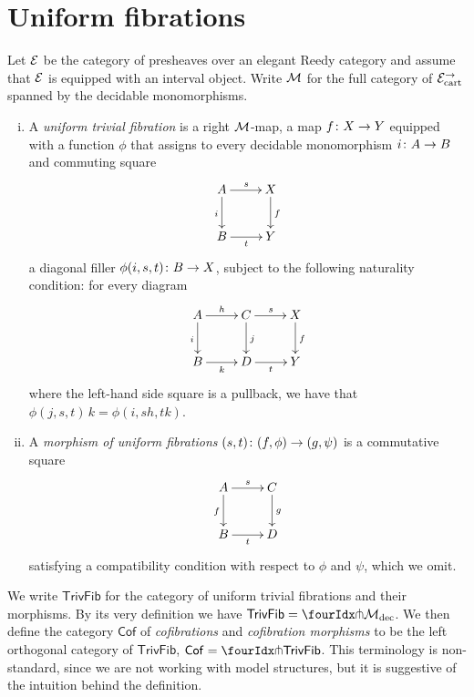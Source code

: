 \documentclass[reqno,10pt,a4paper,oneside]{amsart}
\begin{document}
\section{Uniform  fibrations}
\label{sec:uniform-kan-fibrations}

 
Let $\cal{E}$ be the category of presheaves over an elegant Reedy category and assume that $\cal{E}$
is equipped with an interval object. Write $\cal{M}$ for the full category of $\cal{E}^\to_\cart$ spanned
by the decidable monomorphisms. 

\begin{definition} \hfill
\begin{enumerate}[(i)]
\item A \emph{uniform trivial  fibration} is a right $\cal{M}$-map, \ie a map
$f  \co X \to Y$ equipped with a function $\phi$
that assigns to every decidable monomorphism $i \co A \to B$ and commuting square 
 \[
 \xymatrix{
 A \ar[r]^s \ar[d]_i & X \ar[d]^f \\
 B \ar[r]_t & Y}
 \]
a diagonal filler $\phi(i, s, t) \co B \to X$, subject to the following naturality condition: for every 
diagram 
\[
\xymatrix{
A \ar[r]^{h} \ar[d]_{i} & C \ar[d]^{j}  \ar[r]^s & X \ar[d]^f \\
B \ar[r]_{k} & D \ar[r]_t & Y }
\]
where the left-hand side square is a pullback, we have that $\phi(j, s, t) \, k = \phi(i, s  h, t  k)$.
 \item A \emph{morphism of uniform  fibrations} $(s, t) \co (f, \phi) \to (g, \psi)$ is a commutative
 square
 \[
 \xymatrix{
  A \ar[d]_f \ar[r]^s & C \ar[d]^g \\
  B \ar[r]_{t}& D} 
  \]
  satisfying a compatibility condition with respect to $\phi$ and $\psi$, which we omit. 
\end{enumerate}
\end{definition}

We write $\mathsf{TrivFib}$ for the category of uniform trivial fibrations and their morphisms.
By its very definition we have $\mathsf{TrivFib} = \liftr{\cal{M}_{\textup{dec}}}$. We then define
the category $\mathsf{Cof}$ of \emph{cofibrations} and \emph{cofibration morphisms} to be the left orthogonal
category of $\mathsf{TrivFib}$, \ie $\mathsf{Cof} = \liftl{\mathsf{TrivFib}}$. This terminology is non-standard,
since we are not working with model structures, but it is suggestive of the intuition behind the definition.
\end{document}
